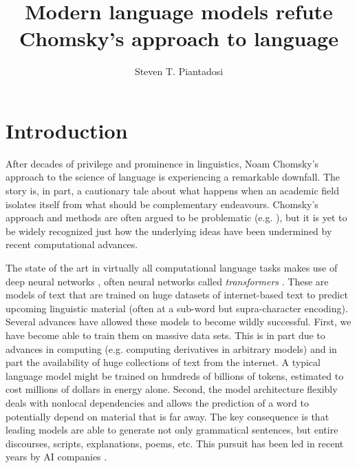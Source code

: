 \documentclass[output=paper,colorlinks,citecolor=brown
]{langscibook}
\author{Steven T. Piantadosi\orcid{}\affiliation{UC Berkeley, Psychology; Helen Wills Neuroscience Institute} }
\title{Modern language models refute Chomsky's approach to language} %
\begin{document}
\maketitle

\section*{Introduction}

After decades of privilege and prominence in linguistics, Noam Chomsky's approach to the science of language is experiencing a remarkable downfall. The  story is, in part, a cautionary tale about what happens when an academic field isolates itself from what should be complementary endeavours. Chomsky's approach and methods are often argued to be problematic (e.g. \cite{harris1993linguistics,pullum1989formal,behme2012potpourri,postal2012two,behme2014galilean}), but it is yet to be widely recognized just how the underlying ideas have been undermined by recent computational advances.

The state of the art in virtually all computational language tasks makes use of deep neural networks \citep{lecun2015deep}, often neural networks called \emph{transformers} \citep{vaswani2017attention,brown2020language,bommasani2021opportunities}. These are models of text that are trained on huge datasets of internet-based text to predict upcoming linguistic material (often at a sub-word but supra-character encoding). Several advances have allowed these models to become wildly successful. First, we have become able to train them on massive data sets. This is in part due to advances in computing (e.g. computing derivatives in arbitrary models) and in part the availability of huge collections of text from the internet. A typical language model might be trained on hundreds of billions of tokens, estimated to cost millions of dollars in energy alone. Second, the model architecture flexibly deals with nonlocal dependencies and allows the prediction of a word to potentially depend on material that is far away. The key consequence is that leading models are able to generate not only grammatical sentences, but entire discourses, scripts, explanations, poems, etc. This pursuit has been led in recent years by AI companies \citep{ahmed2023growing}.
\end{document}
